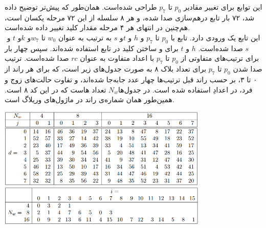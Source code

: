 این توابع برای تغییر مقادیر $ p_0 $ تا $ p_7 $ طراحی شده‌است. همان‌طور که پیش‌تر توضیح داده شد، ۷۲ بار تابع درهم‌سازی صدا شده‌،‌ و هر ۸ سلسله از این ۷۲ مرحله یکسان است، هم‌چنین در انتهای هر ۴ مرحله مقدار کلید تغییر   داده شده‌است.
\\
این تابع یک ورودی   دارد. تابع  \hyperref[subsec:TFBIG-ADDKEY]{} با ‌$ p_0 $ تا  $ p_7 $ و $ h $ و $ t $و ‌$ s $ به ترتیب به عنوان  $ w_0 $ تا $ w_7 $و $ k $و ‌$ t $ و ‌$ s $ صدا شده‌است. ‌$ h $ و $ t $ برای  و ساختن کلید در تابع  استفاده شده‌اند.
سپس   \hyperref[subsec:TFBIG-MIX8]{}چهار بار برای ترتیب‌های متفاوتی از ‌$ p_0 $ تا $ p_7 $ با اعداد متفاوت به عنوان $ rc $ صدا شده‌است. ترتیب صدا شدن $ p_0 $ تا $ p_7 $ برای تعداد بلاک ۸ به صورت جدول‌های زیر است،‌ که برای هر ‌‌راند از ۰ تا ۳، بر حسب راند قبل ترتیب‌ها چهار عدد جابه‌جا شده‌اند، و تفاوت حالت‌های زوج و فرد، در اعدادِ استفاده شده است. در جدول‌ها$  N_w$  تعداد هاست که در این کد ۸ است. همین‌طور  همان شماره‌‌ی راند در ماژول‌های وریلاگ است.
\begin{center}
	\includegraphics[width=10cm]{images/GoldenModelDocumentation/table_mix.png}
	\includegraphics[width= 10cm]{images/GoldenModelDocumentation/Mix2.png}
\end{center}


\subsection{}
\label{subsec:TFBIG-ADDKEY}

